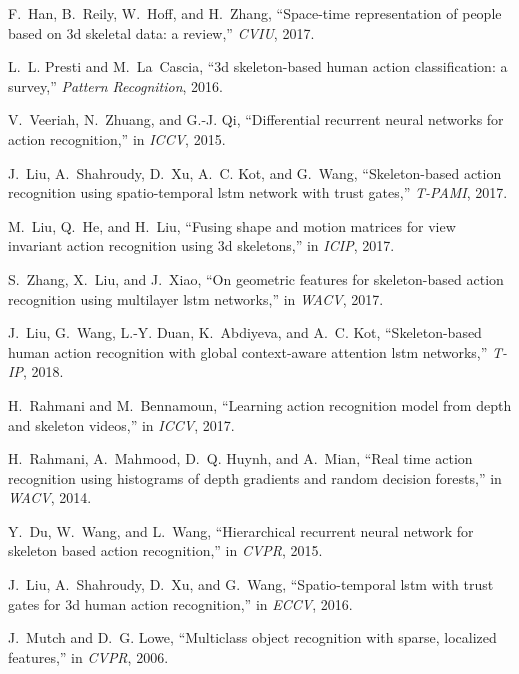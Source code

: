 \documentclass[10pt,twocolumn,letterpaper]{article}
\begin{document}
\begin{thebibliography}{10}
   F.~Han, B.~Reily, W.~Hoff, and H.~Zhang, ``Space-time representation of people
     based on 3d skeletal data: a review,'' \emph{CVIU}, 2017.
   
   L.~L. Presti and M.~La~Cascia, ``3d skeleton-based human action classification:
     a survey,'' \emph{Pattern Recognition}, 2016.
   
   V.~Veeriah, N.~Zhuang, and G.-J. Qi, ``Differential recurrent neural networks
     for action recognition,'' in \emph{ICCV}, 2015.
   
   J.~Liu, A.~Shahroudy, D.~Xu, A.~C. Kot, and G.~Wang, ``Skeleton-based action
     recognition using spatio-temporal lstm network with trust gates,''
     \emph{T-PAMI}, 2017.
   
   M.~Liu, Q.~He, and H.~Liu, ``Fusing shape and motion matrices for view
     invariant action recognition using 3d skeletons,'' in \emph{ICIP}, 2017.
   
   S.~Zhang, X.~Liu, and J.~Xiao, ``On geometric features for skeleton-based
     action recognition using multilayer lstm networks,'' in \emph{WACV}, 2017.
   
   J.~Liu, G.~Wang, L.-Y. Duan, K.~Abdiyeva, and A.~C. Kot, ``Skeleton-based human
     action recognition with global context-aware attention lstm networks,''
     \emph{T-IP}, 2018.
   
   H.~Rahmani and M.~Bennamoun, ``Learning action recognition model from depth and
     skeleton videos,'' in \emph{ICCV}, 2017.
   
   H.~Rahmani, A.~Mahmood, D.~Q. Huynh, and A.~Mian, ``Real time action
     recognition using histograms of depth gradients and random decision
     forests,'' in \emph{WACV}, 2014.
   
   Y.~Du, W.~Wang, and L.~Wang, ``Hierarchical recurrent neural network for
     skeleton based action recognition,'' in \emph{CVPR}, 2015.
   
   J.~Liu, A.~Shahroudy, D.~Xu, and G.~Wang, ``Spatio-temporal lstm with trust
     gates for 3d human action recognition,'' in \emph{ECCV}, 2016.
   
   J.~Mutch and D.~G. Lowe, ``Multiclass object recognition with sparse, localized
     features,'' in \emph{CVPR}, 2006.
   

\end{thebibliography}
\end{document}
